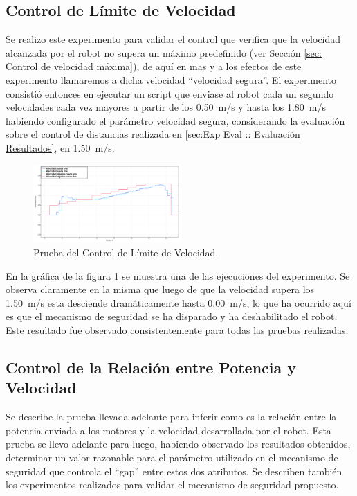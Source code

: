 \documentclass[withindex,glossary]{cam-thesis}
\begin{document}
\subsection{Control de Límite de Velocidad} \label{sec:Exp Eval :: Control Limite Velocidad}
Se realizo este experimento para validar el control que verifica que la velocidad alcanzada por el robot no supera un máximo predefinido (ver Sección \ref{sec: Control de velocidad máxima}), de aquí en mas y a los efectos de este experimento llamaremos a dicha velocidad ``velocidad segura''. El experimento consistió entonces en ejecutar un script que enviase al robot cada un segundo velocidades cada vez mayores a partir de los \SI{0.50}{\metre/\second} y hasta los \SI{1.80}{\metre/\second} habiendo configurado el parámetro velocidad segura, considerando la evaluación sobre el control de distancias realizada en \ref{sec:Exp Eval :: Evaluación Resultados}, en \SI{1.50}{\metre/\second}.

\begin{figure}[H]
  \centering
  \includegraphics[width=0.5\textwidth]{images/Plot_SpeedBrake}
  \caption[Prueba del Control de Límite de Velocidad]{Prueba del Control de Límite de Velocidad.}
  \label{fig:plotSpeedTest}
\end{figure}

En la gráfica de la figura \ref{fig:plotSpeedTest} se muestra una de las ejecuciones del experimento. Se observa claramente en la misma que luego de que la velocidad supera los \SI{1.50}{\metre/\second} esta desciende dramáticamente hasta \SI{0.00}{\metre/\second}, lo que ha ocurrido aquí es que el mecanismo de seguridad se ha disparado y ha deshabilitado el robot. Este resultado fue observado consistentemente para todas las pruebas realizadas.

\subsection{Control de la Relación entre Potencia y Velocidad} \label{sec: Relación Potencia Velocidad}
Se describe la prueba llevada adelante para inferir como es la relación entre la potencia enviada a los motores y la velocidad desarrollada por el robot. Esta prueba se llevo adelante para luego, habiendo observado los resultados obtenidos, determinar un valor razonable para el parámetro utilizado en el mecanismo de seguridad que controla el ``gap'' entre estos dos atributos. Se describen también los experimentos realizados para validar el mecanismo de seguridad propuesto.
\end{document}
